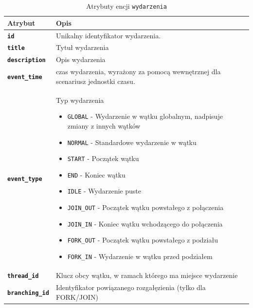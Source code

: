 \begin{table}[H]
    \centering
    \renewcommand{\arraystretch}{1.6}
    \begin{tabular}{|>{\bfseries}l|p{}|}
        \hline
        \rowcolor[HTML]{EFEFEF} \textbf{Atrybut} & \textbf{Opis} \\
        \hline
        \texttt{id} & Unikalny identyfikator wydarzenia. \\
        \hline
        \texttt{title} & Tytuł wydarzenia \\
        \hline
        \texttt{description} & Opis wydarzenia \\
        \hline
        \texttt{event\_time} & czas wydarzenia, wyrażony za pomocą wewnętrznej dla scenariusz jednostki czasu. \\
        \hline
        \texttt{event\_type} & Typ wydarzenia
        \begin{itemize}
            \item \texttt{GLOBAL} - Wydarzenie w wątku globalnym, nadpisuje zmiany z innych wątków
            \item \texttt{NORMAL} - Standardowe wydarzenie w wątku
            \item \texttt{START} - Początek wątku
            \item \texttt{END} - Koniec wątku
            \item \texttt{IDLE} - Wydarzenie puste
            \item \texttt{JOIN\_OUT} - Początek wątku powstałego z połączenia
            \item \texttt{JOIN\_IN} - Koniec wątku wchodzącego do połączenia
            \item \texttt{FORK\_OUT} - Początek wątku powstałego z podziału
            \item \texttt{FORK\_IN} - Wydarzenie w wątku przed podziałem
        \end{itemize} \\
        \hline
        \texttt{thread\_id} & Klucz obcy wątku, w ramach którego ma miejsce wydarzenie \\
        \hline
        \texttt{branching\_id} & Identyfikator powiązanego rozgałęzienia (tylko dla FORK/JOIN) \\
        \hline
    \end{tabular}
    \caption{Atrybuty encji \texttt{wydarzenia}}
\end{table}

